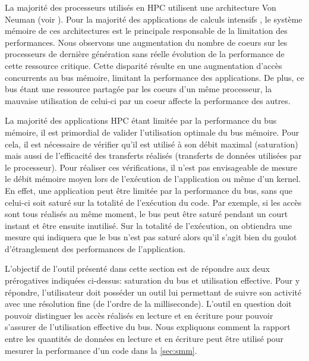         La majorité des processeurs utilisés en HPC utilisent une architecture Von Neuman (voir ). Pour la majorité des applications de calculs intensifs \cite{Drepper2007}, le système mémoire de ces architectures est le principale responsable de la limitation des performances. Nous observons une augmentation du nombre de coeurs sur les processeurs de dernière génération sans réelle évolution de la performance de cette ressource critique. Cette disparité résulte en une augmentation d'accès concurrents au bus mémoire, limitant la performance des applications. De plus, ce bus étant une ressource partagée par les coeurs d'un même processeur, la mauvaise utilisation de celui-ci par un coeur affecte la performance des autres.
        
        La majorité des applications HPC étant limitée par la performance du bus mémoire, il est primordial de valider l'utilisation optimale du bus mémoire. Pour cela, il est nécessaire de vérifier qu'il est utilisé à son débit maximal (saturation) mais aussi de l'efficacité des transferts réalisés (transferts de données utilisées par le processeur). 
        Pour réaliser ces vérifications, il n'est pas envisageable de mesure le débit mémoire moyen lors de l'exécution de l'application ou même d'un \gls{kernel}. En effet, une application peut être limitée par la performance du bus, sans que celui-ci soit saturé sur la totalité de l'exécution du code. Par exemple, si les accès sont tous réalisés au même moment, le bus peut être saturé pendant un court instant et être ensuite inutilisé. Sur la totalité de l'exécution, on obtiendra une mesure qui indiquera que le bus n'est pas saturé alors qu'il s'agit bien du goulot d'étranglement des performances de l'application.
        
    
        L'objectif de l'outil présenté dans cette section est de répondre aux deux prérogatives indiquées ci-dessus: saturation du bus et utilisation effective. Pour y répondre, l'utilisateur doit posséder un outil lui permettant de suivre son activité avec une résolution fine (de l'ordre de la milliseconde). L'outil en question doit pouvoir distinguer les accès réalisés en lecture et en écriture pour pouvoir s'assurer de l'utilisation effective du bus. Nous expliquons comment la rapport entre les quantités de données en lecture et en écriture peut être utilisé pour mesurer la performance d'un code dans la \autoref{sec:smm}.

